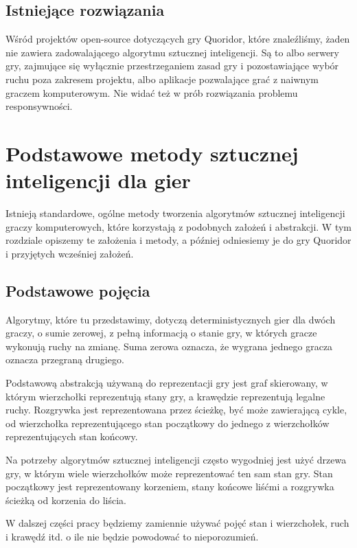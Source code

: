 \documentclass{pracamgr}
\begin{document}
\section{Istniejące rozwiązania}

Wśród projektów open-source dotyczących gry Quoridor, które znaleźliśmy, żaden nie zawiera zadowalającego algorytmu sztucznej inteligencji. Są to albo serwery gry, zajmujące się wyłącznie przestrzeganiem zasad gry i pozostawiające wybór ruchu poza zakresem projektu, albo aplikacje pozwalające grać z naiwnym graczem komputerowym. Nie widać też w prób rozwiązania problemu responsywności.

\chapter{Podstawowe metody sztucznej inteligencji dla gier}

Istnieją standardowe, ogólne metody tworzenia algorytmów sztucznej inteligencji graczy komputerowych, które korzystają z podobnych założeń i abstrakcji. W tym rozdziale opiszemy te założenia i metody, a później odniesiemy je do gry Quoridor i przyjętych wcześniej założeń.

\section{Podstawowe pojęcia}

Algorytmy, które tu przedstawimy, dotyczą deterministycznych gier dla dwóch graczy, o sumie zerowej, z pełną informacją o stanie gry, w których gracze wykonują ruchy na zmianę. Suma zerowa oznacza, że wygrana jednego gracza oznacza przegraną drugiego.

Podstawową abstrakcją używaną do reprezentacji gry jest graf skierowany, w którym wierzchołki reprezentują stany gry, a krawędzie reprezentują legalne ruchy. Rozgrywka jest reprezentowana przez ścieżkę, być może zawierającą cykle, od wierzchołka reprezentującego stan początkowy do jednego z wierzchołków reprezentujących stan końcowy.

Na potrzeby algorytmów sztucznej inteligencji często wygodniej jest użyć drzewa gry, w którym wiele wierzchołków może reprezentować ten sam stan gry. Stan początkowy jest reprezentowany korzeniem, stany końcowe liśćmi a rozgrywka ścieżką od korzenia do liścia.

W dalszej części pracy będziemy zamiennie używać pojęć stan i wierzchołek, ruch i krawędź itd. o ile nie będzie powodować to nieporozumień.
\end{document}

